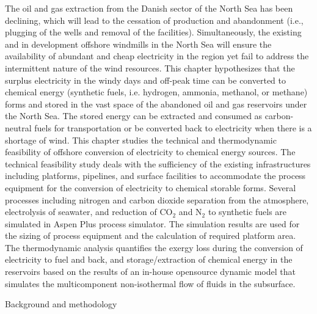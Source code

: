 \documentclass{ECOS_2021}
\begin{document}
The oil and gas extraction from the Danish sector of the North Sea
has been declining, which will lead to the cessation of production
and abandonment (i.e., plugging of the wells and removal of the facilities).
Simultaneously, the existing and in development offshore windmills
in the North Sea will ensure the availability of abundant and cheap
electricity in the region yet fail to address the intermittent nature
of the wind resources. This chapter hypothesizes that the surplus
electricity in the windy days and off-peak time can be converted to
chemical energy (synthetic fuels, i.e. hydrogen, ammonia, methanol,
or methane) forms and stored in the vast space of the abandoned oil
and gas reservoirs under the North Sea. The stored energy can be extracted
and consumed as carbon-neutral fuels for transportation or be converted
back to electricity when there is a shortage of wind. This chapter
studies the technical and thermodynamic feasibility of offshore conversion
of electricity to chemical energy sources. The technical feasibility
study deals with the sufficiency of the existing infrastructures including
platforms, pipelines, and surface facilities to accommodate the process
equipment for the conversion of electricity to chemical storable forms.
Several processes including nitrogen and carbon dioxide separation
from the atmosphere, electrolysis of seawater, and reduction of CO$_{2}$
and N$_{2}$ to synthetic fuels are simulated in Aspen Plus process
simulator. The simulation results are used for the sizing of process
equipment and the calculation of required platform area. The thermodynamic
analysis quantifies the exergy loss during the conversion of electricity
to fuel and back, and storage/extraction of chemical energy in the
reservoirs based on the results of an in-house opensource dynamic
model that simulates the multicomponent non-isothermal flow of fluids
in the subsurface.

Background and methodology 
\end{document}
